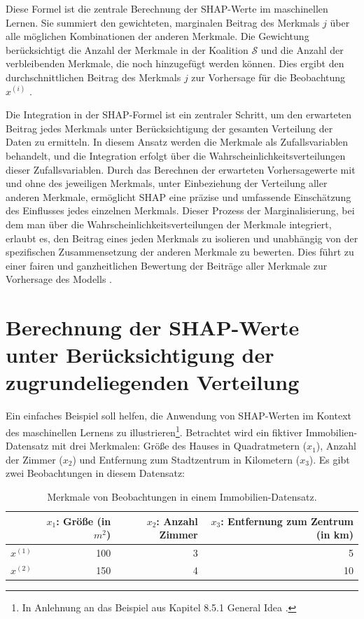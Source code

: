 Diese Formel ist die zentrale Berechnung der SHAP-Werte im maschinellen Lernen. 
Sie summiert den gewichteten, marginalen Beitrag des Merkmals $j$ über alle möglichen Kombinationen der anderen Merkmale. 
Die Gewichtung berücksichtigt die Anzahl der Merkmale in der Koalition $\mathcal{S}$ und die Anzahl der verbleibenden Merkmale, 
die noch hinzugefügt werden können. Dies ergibt den durchschnittlichen Beitrag des Merkmals $j$ zur Vorhersage für die 
Beobachtung $x^{(i)}$ \cite[S. 29, 30]{Molnar_2023}.

Die Integration in der SHAP-Formel ist ein zentraler Schritt, um den erwarteten Beitrag jedes Merkmals unter 
Berücksichtigung der gesamten Verteilung der Daten zu ermitteln. 
In diesem Ansatz werden die Merkmale als Zufallsvariablen behandelt, und die Integration erfolgt über 
die Wahrscheinlichkeitsverteilungen dieser Zufallsvariablen. Durch das Berechnen der erwarteten Vorhersagewerte mit 
und ohne des jeweiligen Merkmals, unter Einbeziehung der Verteilung aller anderen Merkmale, 
ermöglicht SHAP eine präzise und umfassende Einschätzung des Einflusses jedes einzelnen Merkmals. 
Dieser Prozess der Marginalisierung, bei dem man über die Wahrscheinlichkeitsverteilungen der Merkmale integriert, 
erlaubt es, den Beitrag eines jeden Merkmals zu isolieren und unabhängig von der spezifischen Zusammensetzung 
der anderen Merkmale zu bewerten. Dies führt zu einer fairen und ganzheitlichen Bewertung der Beiträge aller Merkmale 
zur Vorhersage des Modells \cite[S. 28]{Molnar_2023}.

\section{Berechnung der SHAP-Werte unter Berücksichtigung der zugrundeliegenden Verteilung}
\label{sec:example}

Ein einfaches Beispiel soll helfen, die Anwendung von SHAP-Werten im 
Kontext des maschinellen Lernens zu illustrieren\footnote{In Anlehnung an das Beispiel aus Kapitel 8.5.1 \glqq{}General Idea\grqq{} \cite[S.215f]{Molnar_2022}.}. Betrachtet wird ein fiktiver 
Immobilien-Datensatz mit drei Merkmalen: Größe des Hauses in Quadratmetern ($x_1$), Anzahl der Zimmer ($x_2$) 
und Entfernung zum Stadtzentrum in Kilometern ($x_3$). Es gibt zwei Beobachtungen in diesem Datensatz:

\begin{table}[H]
    \footnotesize
    \begin{tabularx}{\textwidth}{Xrrr}
    \toprule
     & $x_1$: Größe (in $m^2$) &  $x_2$: Anzahl Zimmer &  $x_3$: Entfernung zum Zentrum (in km) \\
    \midrule
    $x^{(1)}$ & 100 & 3 & 5 \\
    $x^{(2)}$ & 150 & 4 & 10 \\
    \bottomrule
    \end{tabularx}
    \caption{Merkmale von Beobachtungen in einem Immobilien-Datensatz.}
    \label{tab:example}
\end{table}

